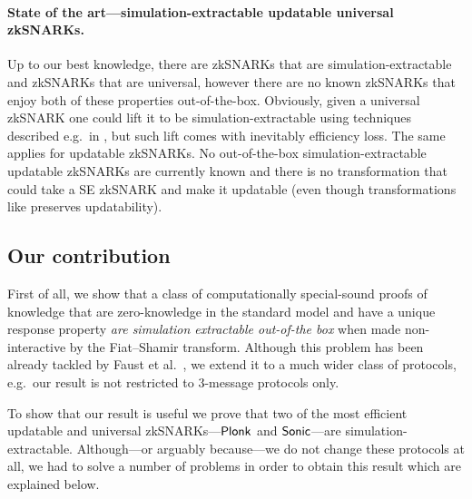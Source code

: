 \let\accentvec\vec \documentclass[runningheads,10pt]{llncs}
\begin{document}
\paragraph{State of the art---simulation-extractable updatable universal zkSNARKs.} 
Up to our best knowledge, there are zkSNARKs that are simulation-extractable
and zkSNARKs that are universal, however there are no known zkSNARKs that enjoy
both of these properties out-of-the-box. Obviously, given a universal zkSNARK
one could lift it to be simulation-extractable using techniques described
e.g.~in \cite{EPRINT:KZMQCP15,CCS:AbdRamSla20}, but such lift comes with
inevitably efficiency loss.  
The same applies for updatable zkSNARKs. No out-of-the-box
simulation-extractable updatable zkSNARKs are
currently known and there is no transformation that could take a SE zkSNARK
and make it updatable (even though transformations like \cite{CCS:AbdRamSla20}
preserves updatability).

\subsection{Our contribution}
First of all, we show that a class of computationally special-sound proofs of
knowledge that are zero-knowledge 
in the standard model and have a unique
response property \emph{are simulation extractable out-of-the box} when made
non-interactive by the Fiat--Shamir transform. Although this problem has been
already tackled by Faust et al.~\cite{INDOCRYPT:FKMV12}, we extend it to a
much wider class of protocols, e.g.~our result is not restricted to
$3$-message protocols only.

To show that our result is useful we prove that two of the most efficient updatable and universal
zkSNARKs---$\textnormal{\textsf{Plonk}}$ and ${\textnormal{\textsf{Sonic}}}$---are simulation-extractable.
Although---or arguably because---we do not change these protocols at all, we had to solve a number of
problems in order to obtain this result which are explained below. 
\end{document}
